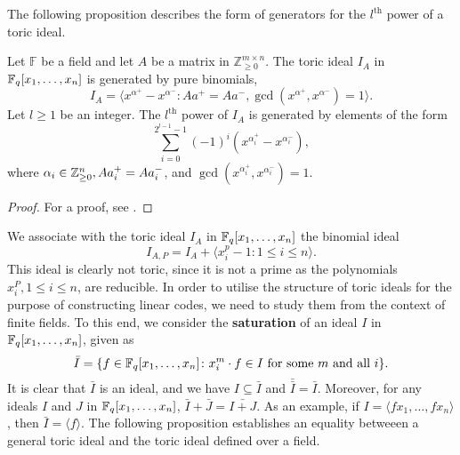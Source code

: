 \documentclass[english,bachelor]{liumaiex}
\begin{document}
The following proposition describes the form of generators for the $l^\textrm{th}$ power of a toric ideal.

\begin{prop}
Let $\mathbb{F}$ be a field and let $A$ be a matrix in $\mathbb{Z}_{\geq0}^{m\times n}$. The toric ideal $I_A$ in $\mathbb{F}_q[x_1,\dots,x_n]$ is generated by pure binomials,
\begin{displaymath}
I_A=\langle x^{\alpha^+}-x^{\alpha^-}\colon Aa^+=Aa^-, \gcd(x^{\alpha^+},x^{\alpha^-})=1\rangle.
\end{displaymath}
Let $l\geq1$ be an integer. The $l^{\textrm{th}}$ power of $I_A$ is generated by elements of the form
\begin{displaymath}
\sum_{i=0}^{2^{l-1}-1}(-1)^i(x^{\alpha_i^+}-x^{\alpha_i^-}),
\end{displaymath}
where $\alpha_i\in\mathbb{Z}_{\geq 0}^n, Aa_i^+=Aa_i^-$, and $\gcd(x^{\alpha_i^+},x^{\alpha_i^-})=1$.
\end{prop}
\begin{proof}
For a proof, see \cite[pp. 52-53]{phd}.
\end{proof}
We associate with the toric ideal $I_A$ in $\mathbb{F}_q[x_1,\dots,x_n]$ the binomial ideal
\begin{displaymath}
I_{A,P}=I_A+\langle x_i^p-1\colon 1\leq i\leq n\rangle.
\end{displaymath}
This ideal is clearly not toric, since it is not a prime as the polynomials $x_i^P, 1\leq i\leq n$, are reducible. In order to utilise the structure of toric ideals for the purpose of constructing linear codes, we need to study them from the context of finite fields. To this end, we consider the \textbf{saturation} of an ideal $I$ in $\mathbb{F}_q[x_1,\dots,x_n]$, given as
\begin{displaymath}
\bar{I}=\{f\in\mathbb{F}_q[x_1,\dots,x_n]\colon x_i^m\cdot f\in I \textrm{ for some } m \textrm{ and all }i\}.
\end{displaymath}
It is clear that $\bar{I}$ is an ideal, and we have $I\subseteq\bar{I}$ and $\bar{\bar{I}}=\bar{I}$. Moreover, for any ideals $I$ and $J$ in $\mathbb{F}_q[x_1,\dots,x_n]$, $\bar{I}+\bar{J}=\bar{I+J}$. As an example, if $I=\langle fx_1,\dots,fx_n\rangle$, then $\bar{I}=\langle f\rangle$. The following proposition establishes an equality betweeen a general toric ideal and the toric ideal defined over a field.
\end{document}
